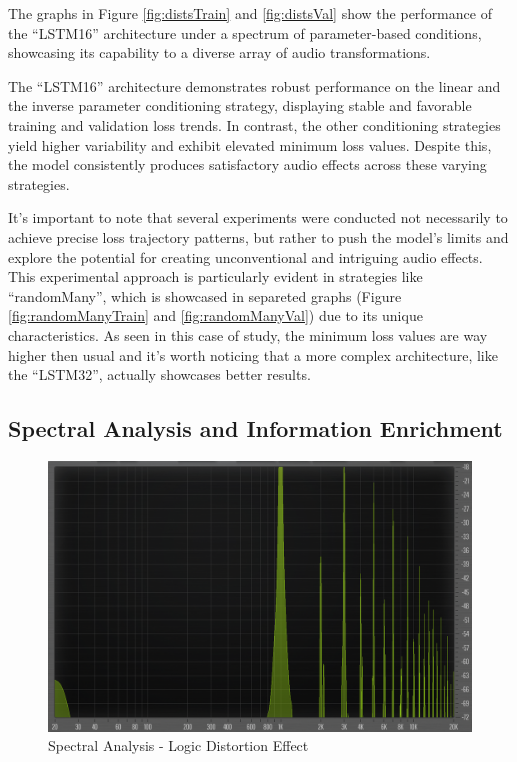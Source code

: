\documentclass{article}
\newcommand{\quotes}[1]{``#1''}
\begin{document}
\begin{sloppy}
The graphs in Figure \ref{fig:distsTrain} and \ref{fig:distsVal} show the performance of the \quotes{LSTM16} architecture under a spectrum of parameter-based conditions, showcasing its capability to a diverse array of audio transformations.

The \quotes{LSTM16} architecture demonstrates robust performance on the linear and the inverse parameter conditioning strategy, displaying stable and favorable training and validation loss trends. In contrast, the other conditioning strategies yield higher variability and exhibit elevated minimum loss values. Despite this, the model consistently produces satisfactory audio effects across these varying strategies.

It's important to note that several experiments were conducted not necessarily to achieve precise loss trajectory patterns, but rather to push the model's limits and explore the potential for creating unconventional and intriguing audio effects. This experimental approach is particularly evident in strategies like \quotes{randomMany}, which is showcased in separeted graphs (Figure \ref{fig:randomManyTrain} and \ref{fig:randomManyVal}) due to its unique characteristics. As seen in this case of study, the minimum loss values are way higher then usual and it's worth noticing that a more complex architecture, like the \quotes{LSTM32}, actually showcases better results.

\subsection{Spectral Analysis and Information Enrichment}
\label{ssec:spectrAnalysis}

\begin{figure}[t]
  \centering
  \centerline{\includegraphics[width=0.95\columnwidth]{./images/dist vera.png}}
  \caption{Spectral Analysis - Logic Distortion Effect}
  \label{fig:logicDist}
\end{figure}


\end{sloppy}
\end{document}
